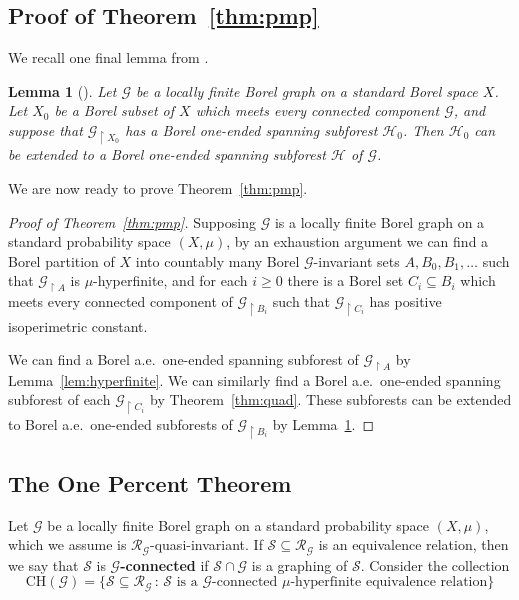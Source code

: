 \documentclass[11pt]{amsart}
\theoremstyle{definition}
\theoremstyle{plain}
\newtheorem{lemma}[definition]{Lemma}
\newcommand{\<}{\langle}
\renewcommand{\>}{\rangle}
\newcommand{\subrel}{\subseteq}
\newcommand{\Ggraph}{\mathcal{G}}
\newcommand{\Hgraph}{\mathcal{H}}
\newcommand{\define}[1]{\textbf{#1}}
\newcommand\RR{\mathscr{R}}
\begin{document}
\subsection{Proof of Theorem~\ref{thm:pmp}}

We recall one final lemma from \cite{CMT-D}.

\begin{lemma}[{\cite[Proposition 3.1]{CMT-D}}]\label{lem:extend}
Let ${\Ggraph}$ be a locally finite Borel graph on a standard Borel space
$X$. Let $X_0$ be a Borel subset of $X$ which meets every connected
component ${\Ggraph}$, and suppose that ${\Ggraph}_{\restriction X_0}$ has a
Borel one-ended spanning subforest ${\Hgraph}_0$. Then ${\Hgraph}_0$ can be
extended to a Borel one-ended spanning subforest ${\Hgraph}$ of ${\Ggraph}$.
\end{lemma}

We are now ready to prove Theorem~\ref{thm:pmp}.

\begin{proof}[Proof of Theorem~\ref{thm:pmp}]
Supposing ${\Ggraph}$ is a
locally finite Borel graph on a standard probability space $(X,\mu)$, by an
exhaustion argument we can find a Borel partition of $X$ into countably
many Borel ${\Ggraph}$-invariant sets $A, B_0,
B_1, \ldots$ such that ${\Ggraph}_{\restriction A}$ is $\mu$-hyperfinite, and for each $i\geq 0$ there is a
Borel set $C_i\subseteq B_i$ which meets every connected component of
${\Ggraph}_{\restriction B_i}$ such that ${\Ggraph}_{\restriction C_i}$ has positive
isoperimetric constant.

We can find a Borel a.e.\ one-ended spanning subforest of $\Ggraph _{\restriction  A}$ by
Lemma~\ref{lem:hyperfinite}. We can similarly find a Borel a.e.\ one-ended
spanning subforest of each $\Ggraph _{\restriction  C_i}$ by Theorem~\ref{thm:quad}. These
subforests can be extended to Borel a.e.\ one-ended subforests of $\Ggraph _{\restriction
B_i}$ by Lemma~\ref{lem:extend}.
\end{proof}

\subsection{The One Percent Theorem}

Let $\Ggraph$ be a locally finite Borel graph on a standard probability
space $(X,\mu)$, which we assume is $\RR_{\Ggraph}$-quasi-invariant. 
If $\mathcal{S} \subrel \RR_{\Ggraph}$ is an equivalence relation, then we say that
$\mathcal{S}$ is \define{$\Ggraph$-connected} if $\mathcal{S}\cap \Ggraph$ is a graphing of $\mathcal{S}$. Consider the collection
\begin{equation*}
\mathrm{CH}(\Ggraph) = \{ \mathcal{S}\subrel \RR_{\Ggraph} \, :
\, \mathcal{S} \text{ is a } \Ggraph\text{-connected } \mu\text{-hyperfinite equivalence relation} \}
\end{equation*}
\end{document}
